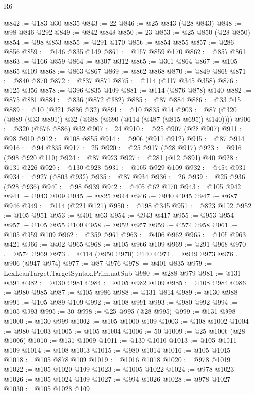 \begin{lexlean}{R6}
\begin{coremodule}
@842 := @183 @30 @835
@843 := 22
@846 := @25 @843 (@28 @843)
@848 := @98 @846 @292
@849 := @842 @848
@850 := 23
@853 := @25 @850 (@28 @850)
@854 := @98 @853
@855 := @291 @170
@856 := @854 @855
@857 := @286 @856
@859 := @146 @835 @149
@861 := @157 @859 @170
@862 := @857 @861
@863 := @166 @859
@864 := @307 @312
@865 := @301 @864
@867 := @105 @865 @109
@868 := @863 @867
@869 := @862 @868
@870 := @849 @869
@871 := @840 @870
@872 := @837 @871
@875 := @114 (@117 @345 @358)
@876 := @125 @356
@878 := @396 @835 @109
@881 := @114 (@876 @878) @140
@882 := @875 @881
@884 := @836 (@872 @882)
@885 := @87 @884
@886 := @33 @15
@889 := @10 (@321 @886 @32)
@891 := @10 @835 @14
@903 := @87 (@320 (@889 (@33 @891)) @32 (@688 (@690 (@114 (@487 (@815 @695)) @140))))
@906 := @320 (@676 @886) @32
@907 := 24
@910 := @25 @907 (@28 @907)
@911 := @98 @910
@912 := @108 @855
@914 := @906 (@911 @912)
@915 := @87 @914
@916 := @94 @835
@917 := 25
@920 := @25 @917 (@28 @917)
@923 := @916 (@98 @920 @110)
@924 := @87 @923
@927 := @281 (@12 @891) @40
@928 := @131 @226
@929 := @130 @928
@931 := @105 @929 @109
@932 := @454 @931
@934 := @927 (@803 @932)
@935 := @87 @934
@936 := 26
@939 := @25 @936 (@28 @936)
@940 := @98 @939
@942 := @405 @62 @170
@943 := @105 @942
@944 := @943 @109
@945 := @825 @944
@946 := @940 @945
@947 := @687 @946
@949 := @114 (@221 @121)
@950 := @198 @345
@951 := @823 @102
@952 := @105 @951
@953 := @401 @63
@954 := @943 @417
@955 := @953 @954
@957 := @105 @955 @109
@958 := @952 @957
@959 := @574 @958
@961 := @105 @959 @109
@962 := @359 @961
@963 := @406 @962
@965 := @105 @963 @421
@966 := @402 @965
@968 := @105 @966 @109
@969 := @291 @968
@970 := @574 @969
@973 := @114 (@950 @970) @140
@974 := @949 @973
@976 := @906 (@947 @974)
@977 := @87 @976
@978 := @401 @835
@979 := LexLeanTarget.TargetSyntax.Prim.natSub
@980 := @288 @979
@981 := @131 @391
@982 := @130 @981
@984 := @105 @982 @109
@985 := @108 @984
@986 := @980 @985
@987 := @105 @986
@988 := @131 @814
@989 := @130 @988
@991 := @105 @989 @109
@992 := @108 @991
@993 := @980 @992
@994 := @105 @993
@995 := 30
@998 := @25 @995 (@28 @995)
@999 := @131 @998
@1000 := @130 @999
@1002 := @105 @1000 @109
@1003 := @108 @1002
@1004 := @980 @1003
@1005 := @105 @1004
@1006 := 50
@1009 := @25 @1006 (@28 @1006)
@1010 := @131 @1009
@1011 := @130 @1010
@1013 := @105 @1011 @109
@1014 := @108 @1013
@1015 := @980 @1014
@1016 := @105 @1015
@1018 := @105 @878 @109
@1019 := @1016 @1018
@1020 := @978 @1019
@1022 := @105 @1020 @109
@1023 := @1005 @1022
@1024 := @978 @1023
@1026 := @105 @1024 @109
@1027 := @994 @1026
@1028 := @978 @1027
@1030 := @105 @1028 @109

\end{coremodule}
\end{lexlean}
